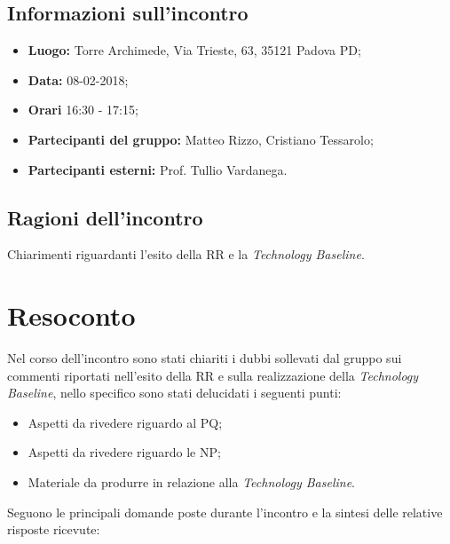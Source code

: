 \documentclass[openany,12pt,a4paper]{article}
\begin{document}
  \subsection{Informazioni sull'incontro} 
   
  \begin{itemize}  
      \item \textbf{Luogo:} Torre Archimede, Via Trieste, 63, 35121 Padova PD;
      \item \textbf{Data:} 08-02-2018; 
      \item \textbf{Orari} 16:30 - 17:15;
      \item \textbf{Partecipanti del gruppo:} Matteo Rizzo, Cristiano Tessarolo; 
      \item \textbf{Partecipanti esterni:} Prof. Tullio Vardanega. 
  \end{itemize} 
 
  \subsection{Ragioni dell'incontro} 
  Chiarimenti riguardanti l'esito della RR e la \textit{Technology Baseline}. 
 
  \section{Resoconto} 
  Nel corso dell'incontro sono stati chiariti i dubbi sollevati dal gruppo sui commenti riportati nell'esito della RR e sulla realizzazione della \textit{Technology Baseline}, nello specifico sono stati delucidati i seguenti punti:
	
  \begin{itemize}
	\item Aspetti da rivedere riguardo al PQ;
	\item Aspetti da rivedere riguardo le NP;
	\item Materiale da produrre in relazione alla \textit{Technology Baseline}.
  \end{itemize}
	
  \noindent Seguono le principali domande poste durante l'incontro e la sintesi delle relative risposte ricevute:
\end{document}
